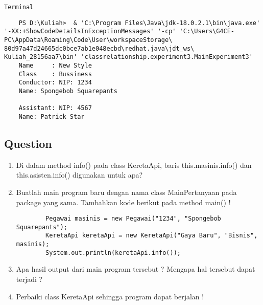 \documentclass[12pt,titlepage]{article}
\begin{document}
\newpage
\noindent \texttt{Terminal}
\begin{verbatim}
    PS D:\Kuliah>  & 'C:\Program Files\Java\jdk-18.0.2.1\bin\java.exe' '-XX:+ShowCodeDetailsInExceptionMessages' '-cp' 'C:\Users\G4CE-PC\AppData\Roaming\Code\User\workspaceStorage\ 80d97a47d24665dc0bce7ab1e048ecbd\redhat.java\jdt_ws\ Kuliah_28156aa7\bin' 'classrelationship.experiment3.MainExperiment3'
    Name     : New Style       
    Class    : Bussiness       
    Conductor: NIP: 1234       
    Name: Spongebob Squarepants

    Assistant: NIP: 4567       
    Name: Patrick Star
\end{verbatim}

\subsection{Question}
\begin{enumerate}
    \item Di dalam method info() pada class KeretaApi, baris this.masinis.info() dan this.asisten.info() digunakan untuk apa?
    \item Buatlah main program baru dengan nama class MainPertanyaan pada package yang sama. Tambahkan kode berikut pada method main() !
    \begin{verbatim}
        Pegawai masinis = new Pegawai("1234", "Spongebob Squarepants");
        KeretaApi keretaApi = new KeretaApi("Gaya Baru", "Bisnis", masinis);
        System.out.println(keretaApi.info());
    \end{verbatim} 
    \item Apa hasil output dari main program tersebut ? Mengapa hal tersebut dapat terjadi ?
    \item Perbaiki class KeretaApi sehingga program dapat berjalan !
\end{enumerate}
\end{document}
